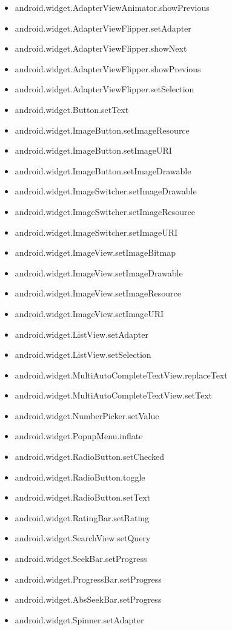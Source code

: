 \documentclass{sig-alternate}
\begin{document}
\begin{itemize}
\item android.widget.AdapterViewAnimator.showPrevious
\item android.widget.AdapterViewFlipper.setAdapter
\item android.widget.AdapterViewFlipper.showNext
\item android.widget.AdapterViewFlipper.showPrevious
\item android.widget.AdapterViewFlipper.setSelection
\item android.widget.Button.setText
\item android.widget.ImageButton.setImageResource
\item android.widget.ImageButton.setImageURI
\item android.widget.ImageButton.setImageDrawable
\item android.widget.ImageSwitcher.setImageDrawable
\item android.widget.ImageSwitcher.setImageResource
\item android.widget.ImageSwitcher.setImageURI
\item android.widget.ImageView.setImageBitmap
\item android.widget.ImageView.setImageDrawable
\item android.widget.ImageView.setImageResource
\item android.widget.ImageView.setImageURI
\item android.widget.ListView.setAdapter
\item android.widget.ListView.setSelection
\item android.widget.MultiAutoCompleteTextView.replaceText
\item android.widget.MultiAutoCompleteTextView.setText
\item android.widget.NumberPicker.setValue
\item android.widget.PopupMenu.inflate
\item android.widget.RadioButton.setChecked
\item android.widget.RadioButton.toggle
\item android.widget.RadioButton.setText
\item android.widget.RatingBar.setRating
\item android.widget.SearchView.setQuery
\item android.widget.SeekBar.setProgress
\item android.widget.ProgressBar.setProgress
\item android.widget.AbsSeekBar.setProgress
\item android.widget.Spinner.setAdapter

\end{itemize}
\end{document}
